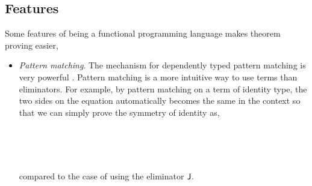 \subsection{Features}\label{features}

Some features of being a functional programming language makes theorem proving easier,

\begin{itemize}
\item \textit{Pattern matching}. The mechanism for dependently typed pattern matching is very powerful \cite{alti:pisigma-new}. Pattern matching is a more intuitive way to use terms than eliminators. For example, by pattern matching on a term of identity type, the two sides on the equation automatically becomes the same in the context so that we can simply prove the symmetry of identity as,

\begin{code}
\\
\> \AgdaSymbol{:} \AgdaSymbol{\{} \AgdaSymbol{:} \AgdaSymbol{\}\{}  \AgdaSymbol{:} \AgdaSymbol{\}}        \<%
\\
\>  \AgdaSymbol{=} \<%
\\
\end{code}

compared to the case of using the eliminator $\operatorname{\mathsf{J}}$.

\begin{code}\label{symmetry}
\\
\> \AgdaSymbol{:} \AgdaSymbol{\{} \AgdaSymbol{:} \AgdaSymbol{\}\{}  \AgdaSymbol{:} \AgdaSymbol{\}}        \<%
\\
\> \AgdaSymbol{=}     \AgdaBound{\_}    \AgdaSymbol{)}  \AgdaBound{\_}  \AgdaSymbol{)} \AgdaSymbol{\_} \AgdaSymbol{\_}\<%
\\
\end{code}


\end{itemize}
